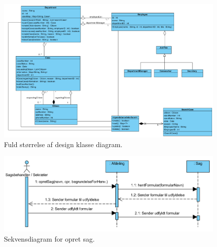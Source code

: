 \begin{figure}[hbt!]
  \includegraphics[width=\linewidth]{./PNG/design/fulddesignklassediagram.PNG} 
  \caption{Fuld størrelse af design klasse diagram.}
  \label{fig:fuldDesignKlasseDiagram}
\end{figure}

\begin{figure}[hbt!]
  \includegraphics[width=\linewidth]{./PNG/sekDiaOpretSag.PNG} 
  \caption{Sekvensdiagram for opret sag.}
  \label{fig:OpretSag}
\end{figure}

